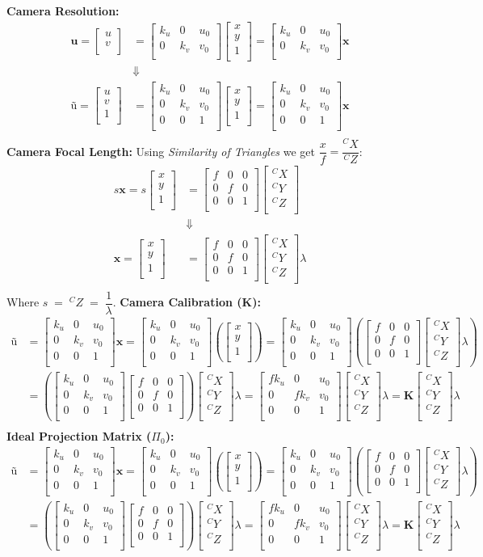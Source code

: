 \documentclass[a4paper,10pt]{article}
\newcommand{\sNHu}{\ensuremath{\textbf{u}}}
\newcommand{\sHu}{\ensuremath{\textbf{\~{u}}}}
\newcommand{\sHx}{\ensuremath{\textbf{\~{x}}}}
\newcommand{\sNHK}{\ensuremath{\textbf{K}}}
\newcommand{\vNHuv}{\ensuremath{\left[\begin{array}{c}u\\v\\\end{array}\right]}}
\newcommand{\vHuv}{\ensuremath{\left[\begin{array}{c}u\\v\\1\\\end{array}\right]}}
\newcommand{\vHxy}{\ensuremath{\left[\begin{array}{c}x\\y\\1\\\end{array}\right]}}
\newcommand{\mNHkuv}{\ensuremath{\left[\begin{array}{ccc}k_u & 0 & u_0\\0 & k_v & v_0\\\end{array}\right]}}
\newcommand{\mHkuv}{\ensuremath{\left[\begin{array}{ccc}k_u & 0 & u_0\\0 & k_v & v_0\\ 0 & 0 & 1\\\end{array}\right]}}
\newcommand{\mNHf}{\ensuremath{\left[\begin{array}{ccc}f & 0 & 0\\0 & f & 0\\0 & 0 & 1\\\end{array}\right]}}
\newcommand{\vNHcx}{\ensuremath{\left[\begin{array}{c}^CX\\^CY\\^CZ\\\end{array}\right]}}
\newcommand{\mHfkuv}{\ensuremath{\left[\begin{array}{ccc}fk_u & 0 & u_0\\0 & fk_v & v_0\\ 0 & 0 & 1\\\end{array}\right]}}
\begin{document}
\textbf{Camera Resolution:}
\begin{equation}
\begin{split}
\sNHu = \vNHuv &= \mNHkuv\vHxy = \mNHkuv\sHx\\
& \Downarrow 
\\
\sHu = \vHuv &= \mHkuv\vHxy = \mHkuv\sHx\\
\end{split}
\end{equation}
\newline\noindent\newline\noindent
\textbf{Camera Focal Length:}
\newline\noindent\newline\noindent
Using \emph{Similarity of Triangles} we get $\dfrac{x}{f} = \dfrac{^CX}{^CZ}$: 
\begin{equation}
\begin{split}
s\sHx = s\vHxy &= \mNHf\vNHcx \\
& \Downarrow \\
\sHx = \vHxy &= \mNHf\vNHcx\lambda \\
\end{split}
\end{equation}
Where $s\;=\;^CZ\;=\;\dfrac{1}{\lambda}$.
\newpage\noindent
\textbf{Camera Calibration ($\sNHK$):}
\newline\noindent\newline\noindent
\begin{equation}
\begin{split}
\sHu &= \mHkuv\sHx = \mHkuv\left(\vHxy\right)=\mHkuv\left(\mNHf\vNHcx\lambda\right)\\
&=\left(\mHkuv\mNHf\right)\vNHcx\lambda=\mHfkuv\vNHcx\lambda=\sNHK\vNHcx\lambda\\\
\end{split}
\end{equation}
\newline\noindent\newline\noindent
\textbf{Ideal Projection Matrix ($\Pi_0$):}
\newline\noindent\newline\noindent
\begin{equation}
\begin{split}
\sHu &= \mHkuv\sHx = \mHkuv\left(\vHxy\right)=\mHkuv\left(\mNHf\vNHcx\lambda\right)\\
&=\left(\mHkuv\mNHf\right)\vNHcx\lambda=\mHfkuv\vNHcx\lambda=\sNHK\vNHcx\lambda\\\
\end{split}
\end{equation}
\end{document}
